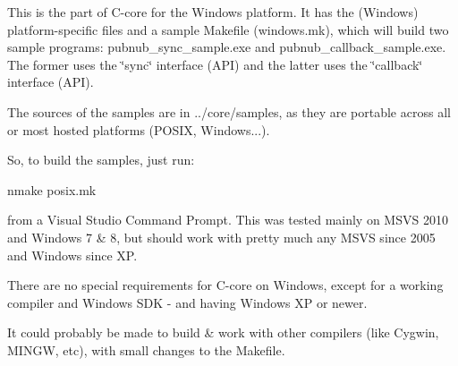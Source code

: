 This is the part of C-\/core for the Windows platform. It has the (Windows) platform-\/specific files and a sample Makefile ({\ttfamily windows.\-mk}), which will build two sample programs\-: {\ttfamily pubnub\-\_\-sync\-\_\-sample.\-exe} and {\ttfamily pubnub\-\_\-callback\-\_\-sample.\-exe}. The former uses the \char`\"{}sync\char`\"{} interface (A\-P\-I) and the latter uses the \char`\"{}callback\char`\"{} interface (A\-P\-I).

The sources of the samples are in {\ttfamily ../core/samples}, as they are portable across all or most hosted platforms (P\-O\-S\-I\-X, Windows...).

So, to build the samples, just run\-: \begin{DoxyVerb}nmake posix.mk
\end{DoxyVerb}


from a Visual Studio Command Prompt. This was tested mainly on M\-S\-V\-S 2010 and Windows 7 \& 8, but should work with pretty much any M\-S\-V\-S since 2005 and Windows since X\-P.

There are no special requirements for C-\/core on Windows, except for a working compiler and Windows S\-D\-K -\/ and having Windows X\-P or newer.

It could probably be made to build \& work with other compilers (like Cygwin, M\-I\-N\-G\-W, etc), with small changes to the Makefile. 